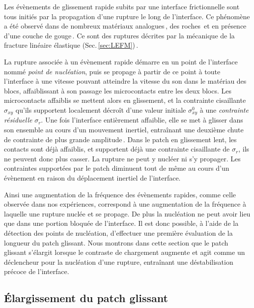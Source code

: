Les évènements de glissement rapide subits par une interface frictionnelle sont tous initiés par la propagation d'une rupture le long de l'interface. Ce phénomène a été observé dans de nombreux matériaux analogues\,\cite{nielsen_experimental_2010,
rubinstein_detachment_2004,
svetlizky_brittle_2019,
xia_laboratory_2004}, des roches\,\cite{mclaskey_slow_2017,
passelegue_sub-rayleigh_2013,xu_strain_2018} et en présence d'une couche de gouge\,\cite{buijze_effects_2021,
ma_period_2001}.
Ce sont des ruptures décrites par la mécanique de la fracture linéaire élastique (Sec.\,\ref{sec:LEFM})\,\cite{svetlizky_brittle_2019}.

La rupture associée à un évènement rapide démarre en un point de l'interface nommé \textit{point de nucléation}, puis se propage à partir de ce point à toute l'interface à une vitesse pouvant atteindre la vitesse du son dans le matériau des blocs, affaiblissant à son passage les microcontacts entre les deux blocs. Les microcontacts affaiblis se mettent alors en glissement, et la contrainte cisaillante $\sigma_{xy}$ qu'ils supportent localement décroît d'une valeur initiale $\sigma_{xy}^0$ à une \textit{contrainte résiduelle} $\sigma_r$. Une fois l'interface entièrement affaiblie, elle se met à glisser dans son ensemble au cours d'un mouvement inertiel, entraînant une deuxième chute de contrainte de plus grande amplitude\,\cite{passelegue_frictional_2016}. Dans le patch en glissement lent, les contacts sont déjà affaiblis, et supportent déjà une contrainte cisaillante de $\sigma_r$, ils ne peuvent donc plus casser. La rupture ne peut y nucléer ni s'y propager. Les contraintes supportées par le patch diminuent tout de même au cours d'un évènement en raison du déplacement inertiel de l'interface.


Ainsi une augmentation de la fréquence des évènements rapides, comme celle observée dans nos expériences, correspond à une augmentation de la fréquence à laquelle une rupture nuclée et se propage. De plus la nucléation ne peut avoir lieu que dans une portion bloquée de l'interface. Il est donc possible, à l'aide de la détection des points de nucléation, d'effectuer une première évaluation de la longueur du patch glissant. Nous montrons dans cette section que le patch glissant s'élargit lorsque le contraste de chargement augmente et agit comme un déclencheur pour la nucléation d'une rupture, entraînant une déstabilisation précoce de l'interface.



\subsection{Élargissement du patch glissant}

